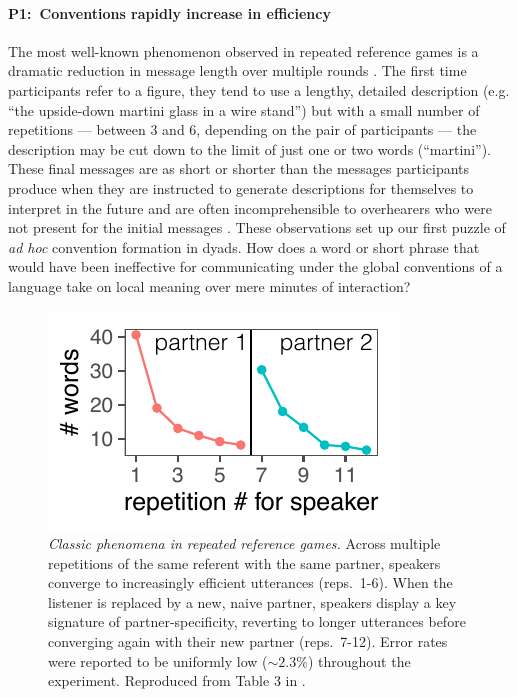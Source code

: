 \paragraph{\textbf{P1}:~Conventions rapidly increase in efficiency}

The most well-known phenomenon observed in repeated reference games is a dramatic reduction in message length over multiple rounds \cite{krauss_changes_1964, ClarkWilkesGibbs86_ReferringCollaborative, hawkins2020characterizing}. 
The first time participants refer to a figure, they tend to use a lengthy, detailed description (e.g. ``the upside-down martini glass in a wire stand'') but with a small number of repetitions --- between 3 and 6, depending on the pair of participants --- the description may be cut down to the limit of just one or two words (``martini''). 
These final messages are as short or shorter than the messages participants produce when they are instructed to generate descriptions for themselves to interpret in the future \cite{FussellKrauss89_IntendedAudienceCommonGround} and are often incomprehensible to overhearers who were not present for the initial messages \cite{SchoberClark89_Overhearers}.
These observations set up our first puzzle of \emph{ad hoc} convention formation in dyads.
How does a word or short phrase that would have been ineffective for communicating under the global conventions of a language take on local meaning over mere minutes of interaction? 

\begin{figure}[t!]
\centering
\includegraphics[scale=1.2]{./figures/clark92}
\vspace{1em}
\caption{\textit{Classic phenomena in repeated reference games.} Across multiple repetitions of the same referent with the same partner, speakers converge to increasingly efficient utterances (reps.~1-6). When the listener is  replaced by a new, naive partner, speakers display a key signature of partner-specificity, reverting to longer utterances before converging again with their new partner (reps.~7-12). Error rates were reported to be uniformly low ($\sim 2.3\%$) throughout the experiment. Reproduced from Table 3 in \protect{}.}
\label{fig:clark92}
\end{figure}

